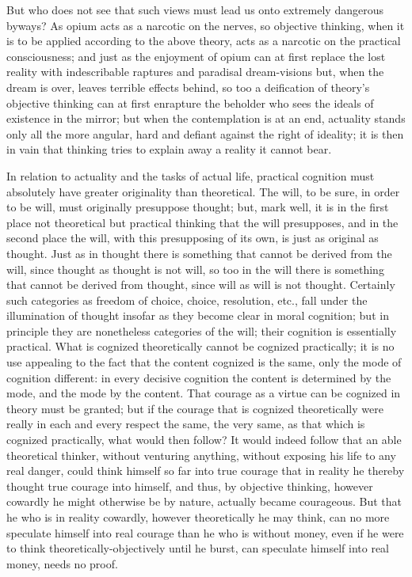 \documentclass[12pt,a4paper]{article}
\newcommand{\opage}[1]{\marginnote{\footnotesize\textit{[#1]}}}
\begin{document}
But who does not see that such views must lead us onto extremely
dangerous byways? As opium acts as a narcotic on the nerves, so
objective thinking, when it is to be applied according to the above
theory, acts as a narcotic on the practical consciousness; and just as
the enjoyment of opium can at first replace the lost reality with
indescribable raptures and paradisal dream-visions but, when the dream
is over, leaves terrible effects behind, so too a deification of
theory's objective thinking can at first enrapture the beholder who
sees the ideals of existence in the mirror; but when the contemplation
is at an end, actuality stands only all the more angular, hard and
defiant against the right of ideality; it is then in vain that
thinking tries to explain away a reality it cannot bear.

In relation to actuality and the tasks of actual life, practical
cognition must absolutely have greater originality than theoretical.
The will, to be sure, in order to be will, must originally presuppose
thought; but, mark well, it is in the first place not theoretical but
practical thinking that the will presupposes, and in the second place
the will, with this presupposing of its own, is just as original as
thought. Just as in thought there is something that cannot be derived
from
\opage{69}the will, since thought as thought is not will, so too in
the will there is something that cannot be derived from thought, since
will as will is not thought. Certainly such categories as freedom of
choice, choice, resolution, etc., fall under the illumination of
thought insofar as they become clear in moral cognition; but in
principle they are nonetheless categories of the will; their cognition
is essentially practical. What is cognized theoretically cannot be
cognized practically; it is no use appealing to the fact that the
content cognized is the same, only the mode of cognition different: in
every decisive cognition the content is determined by the mode, and
the mode by the content. That courage as a virtue can be cognized in
theory must be granted; but if the courage that is cognized
theoretically were really in each and every respect the same, the very
same, as that which is cognized practically, what would then follow?
It would indeed follow that an able theoretical thinker, without
venturing anything, without exposing his life to any real danger,
could think himself so far into true courage that in reality he
thereby thought true courage into himself, and thus, by objective
thinking, however cowardly he might otherwise be by nature, actually
became courageous. But that he who is in reality cowardly, however
theoretically he may think, can no more speculate himself into real
courage than he who is without money, even if he were to think
theoretically-objectively until he burst, can speculate himself into
real money, needs no proof.
\end{document}
